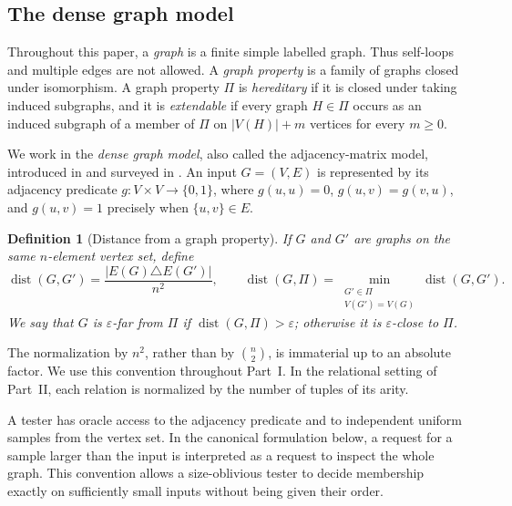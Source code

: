 \documentclass[11pt,reqno,letterpaper]{amsart}
\newcommand{\dist}{\operatorname{dist}}
\theoremstyle{plain}
\newtheorem{defn}[thm]{Definition}
\theoremstyle{remark}
\begin{document}
\subsection{The dense graph model}

Throughout this paper, a \textit{graph} is a finite simple labelled graph.  Thus
self-loops and multiple edges are not allowed.  A \textit{graph property} is a
family of graphs closed under isomorphism.  A graph property $\Pi$ is
\textit{hereditary} if it is closed under taking induced subgraphs, and it is
\textit{extendable} if every graph $H\in\Pi$ occurs as an induced subgraph of a
member of $\Pi$ on $|V(H)|+m$ vertices for every $m\geq0$.

We work in the \textit{dense graph model}, also called the adjacency-matrix
model, introduced in \cite{goldreich1998property} and surveyed in
\cite{goldreich2017introduction,bhattacharyyaYoshida2022property}.  An input
$G=(V,E)$ is represented by its adjacency predicate
$g:V\times V\to\{0,1\}$, where $g(u,u)=0$, $g(u,v)=g(v,u)$, and
$g(u,v)=1$ precisely when $\{u,v\}\in E$.

\begin{defn}[Distance from a graph property]
If $G$ and $G'$ are graphs on the same $n$-element vertex set, define
\[
\dist(G,G')=\frac{|E(G)\triangle E(G')|}{n^2},
\qquad
\dist(G,\Pi)=\min_{\substack{G'\in\Pi\\V(G')=V(G)}}\dist(G,G').
\]
We say that $G$ is \textit{$\varepsilon$-far from $\Pi$} if
$\dist(G,\Pi)>\varepsilon$; otherwise it is
\textit{$\varepsilon$-close to $\Pi$}.
\end{defn}

The normalization by $n^2$, rather than by $\binom n2$, is immaterial up to an
absolute factor.  We use this convention throughout Part~I.  In the relational
setting of Part~II, each relation is normalized by the number of tuples of its
arity.

A tester has oracle access to the adjacency predicate and to independent
uniform samples from the vertex set.  In the canonical formulation below, a
request for a sample larger than the input is interpreted as a request to
inspect the whole graph.  This convention allows a size-oblivious tester to
decide membership exactly on sufficiently small inputs without being given
their order.
\end{document}
